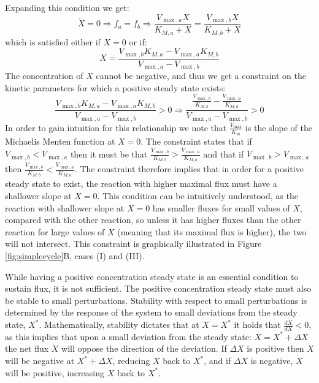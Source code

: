     Expanding this condition we get:
    \begin{equation*}
      \dot X = 0 \Rightarrow f_a = f_b \Rightarrow \frac{V_{\max,a}X}{K_{M,a}+X}=\frac{V_{\max,b}X}{K_{M,b}+X}
    \end{equation*}
    which is satisfied either if $X=0$ or if:
    \begin{equation}
      \label{eq:xstst}
      X=\frac{V_{\max,b}K_{M,a}-V_{\max,a}K_{M,b}}{V_{\max,a}-V_{\max,b}}
    \end{equation}
    The concentration of $X$ cannot be negative, and thus we get a constraint on the kinetic parameters for which a positive steady state exists:
    \begin{equation*}
      \frac{V_{\max,b}K_{M,a}-V_{\max,a}K_{M,b}}{V_{\max,a}-V_{\max,b}}>0 \Rightarrow \frac{\frac{V_{\max,b}}{K_{M,b}}-\frac{V_{\max,a}}{K_{M,a}}}{V_{\max,a}-V_{\max,b}}>0
    \end{equation*}
    In order to gain intuition for this relationship we note that $\frac{V_{\max}}{K_m}$ is the slope of the Michaelis Menten function at $X=0$.
    The constraint states that if $V_{\max,b}<V_{\max,a}$ then it must be that $\frac{V_{\max,b}}{K_{M,b}}>\frac{V_{\max,a}}{K_{M,a}}$ and that if $V_{\max,b}>V_{\max,a}$ then $\frac{V_{\max,b}}{K_{M,b}}<\frac{V_{\max,a}}{K_{M,a}}$.
    The constraint therefore implies that in order for a positive steady state to exist, the reaction with higher maximal flux must have a shallower slope at $X=0$.
    This condition can be intuitively understood, as the reaction with shallower slope at $X=0$ has smaller fluxes for small values of $X$, compared with the other reaction, so unless it has higher fluxes than the other reaction for large values of $X$ (meaning that its maximal flux is higher), the two will not intersect.
    This constraint is graphically illustrated in Figure \ref{fig:simplecycle}B, cases (I) and (III).

    While having a positive concentration steady state is an essential condition to sustain flux, it is not sufficient.
    The positive concentration steady state must also be stable to small perturbations.
    Stability with respect to small perturbations is determined by the response of the system to small deviations from the steady state, $X^*$.
    Mathematically, stability dictates that at $X=X^*$ it holds that $\frac{d\dot X}{dX} <0$, as this  implies that upon a small deviation from the steady state: $X = X^*+\Delta X$ the net flux $\dot X$ will oppose the direction of the deviation.
    If $\Delta X$ is positive then $\dot X$ will be negative at $X^*+\Delta X$, reducing $X$ back to $X^*$, and if $\Delta X$ is negative, $\dot X$ will be positive, increasing $X$ back to $X^*$.

